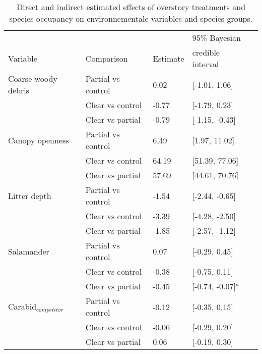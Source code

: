 \begin{table}[ht]
  \centering
  \caption[Direct and indirect estimated effects of overstory treatments and species occupancy on environnementale variables and species groups]
  {Direct and indirect estimated effects of overstory treatments and species occupancy on environnementale variables and species groups.}
  \label{tab:overstory}
  \begin{tabular}{lllll} 
      \hline
      &&&95\% Bayesian \\
      Variable & Comparison & Estimate &  credible interval \\ [0.5ex] 
      \hline
      Coarse woody debris & Partial vs control & \hspace{1mm}0.02 & [-1.01, 1.06] \\ 
                          & Clear vs control  & -0.77 & [-1.79, 0.23] \\ 
                          & Clear vs partial  & -0.79 & [-1.15, -0.43] \\
      Canopy openness     & Partial vs control & \hspace{1mm}6,49 & [1.97, 11.02] \\ 
                          & Clear vs control  & \hspace{1mm}64.19 & [51.39, 77.06] \\ 
                          & Clear vs partial  & \hspace{1mm}57.69 & [44.61, 70.76] \\ 
      Litter depth        & Partial vs control & -1.54 & [-2.44, -0.65] \\ 
                          & Clear vs control  & -3.39 & [-4.28, -2.50] \\ 
                          & Clear vs partial  & -1.85 & [-2.57, -1.12] \\       
      Salamander          & Partial vs control & \hspace{1mm}0.07 & [-0.29, 0.45] \\ 
                          & Clear vs control  & -0.38 & [-0.75, 0.11] \\ 
                          & Clear vs partial  & -0.45 & [-0.74, -0.07]$^{a}$ \\       
      Carabid$_{competitor}$ & Partial vs control & -0.12 & [-0.35, 0.15] \\
                          & Clear vs control  & -0.06 & [-0.29, 0.20] \\ 
                          & Clear vs partial  & \hspace{1mm}0.06 & [-0.19, 0.30] \\ 

\end{tabular}
\end{table}
